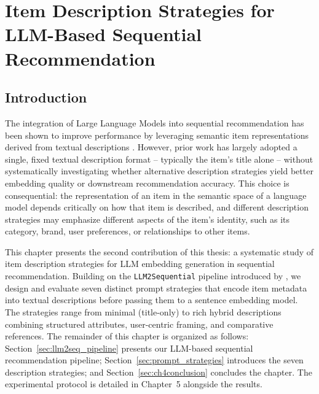 \documentclass[12pt,a4paper]{report}
\begin{document}
\chapter{Item Description Strategies for LLM-Based Sequential Recommendation}

\section{Introduction}

\justifying
The integration of Large Language Models into sequential recommendation has
been shown to improve performance by leveraging semantic item representations
derived from textual descriptions \citep{boz2025}. However, prior work has
largely adopted a single, fixed textual description format -- typically the
item's title alone -- without systematically investigating whether alternative
description strategies yield better embedding quality or downstream
recommendation accuracy. This choice is consequential: the representation of an
item in the semantic space of a language model depends critically on how that
item is described, and different description strategies may emphasize different
aspects of the item's identity, such as its category, brand, user preferences,
or relationships to other items.

This chapter presents the second contribution of this thesis: a systematic
study of item description strategies for LLM embedding generation in sequential
recommendation. Building on the \texttt{LLM2Sequential} pipeline introduced by
\citep{boz2025}, we design and evaluate seven distinct prompt strategies that
encode item metadata into textual descriptions before passing them to a
sentence embedding model. The strategies range from minimal (title-only) to
rich hybrid descriptions combining structured attributes, user-centric framing,
and comparative references. The remainder of this chapter is organized as
follows: Section~\ref{sec:llm2seq_pipeline} presents our LLM-based
sequential recommendation pipeline; Section~\ref{sec:prompt_strategies}
introduces the seven description strategies; and
Section~\ref{sec:ch4conclusion} concludes the chapter. The experimental
protocol is detailed in Chapter~5 alongside the results.

\end{document}
